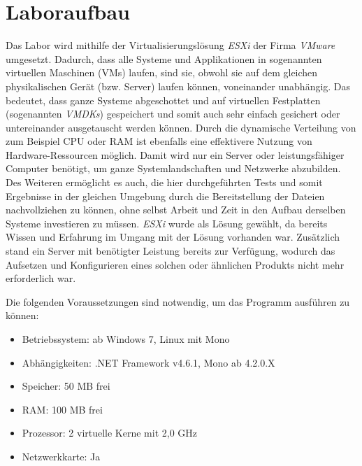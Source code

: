 \section{Laboraufbau} \label{Laboraufbau}
    Das Labor wird mithilfe der Virtualisierungslösung \emph{ESXi} %
    der Firma \emph{VMware} umgesetzt. Dadurch, dass alle Systeme und Applikationen in sogenannten virtuellen Maschinen (VMs) laufen, sind sie, obwohl sie auf dem gleichen physikalischen Gerät (bzw. Server) laufen können, voneinander unabhängig. Das bedeutet, dass ganze Systeme abgeschottet und auf virtuellen Festplatten (sogenannten \emph{\acp{VMDK}}) gespeichert und somit auch sehr einfach gesichert oder untereinander ausgetauscht werden können. Durch die dynamische Verteilung von zum Beispiel \ac{CPU} oder \ac{RAM} ist ebenfalls eine effektivere Nutzung von Hardware-Ressourcen möglich. Damit wird nur ein Server oder leistungsfähiger Computer benötigt, um ganze Systemlandschaften und Netzwerke abzubilden. Des Weiteren ermöglicht es auch, die hier durchgeführten Tests und somit Ergebnisse in der gleichen Umgebung durch die Bereitstellung der Dateien nachvollziehen zu können, ohne selbst Arbeit und Zeit in den Aufbau derselben Systeme investieren zu müssen.
    \emph{ESXi} wurde als Lösung gewählt, da bereits Wissen und Erfahrung im Umgang mit der Lösung vorhanden war. Zusätzlich stand ein Server mit benötigter Leistung bereits zur Verfügung, wodurch das Aufsetzen und Konfigurieren eines solchen oder ähnlichen Produkts nicht mehr erforderlich war.
    
    Die folgenden Voraussetzungen sind notwendig, um das Programm ausführen zu können:
    \begin{itemize}
        \item Betriebssystem: ab Windows 7, Linux mit Mono
        \item Abhängigkeiten: .NET Framework v4.6.1, Mono ab 4.2.0.X
        \item Speicher: 50 \ac{MB} frei
        \item RAM: 100 \ac{MB} frei
        \item Prozessor: 2 virtuelle Kerne  mit 2,0 \ac{GHz}
        \item Netzwerkkarte: Ja
    \end{itemize}
    
